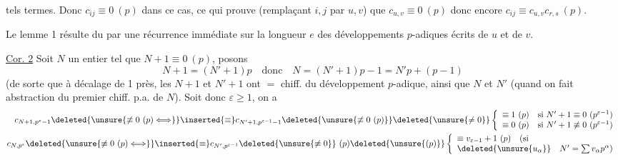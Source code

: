 
tels termes. Donc $c_{ij}\equiv0\ (p)$ dans ce cas, ce qui prouve (remplaçant $i,j$ par $u,v$) que $c_{u,v}\equiv0\ (p)$ donc encore $c_{ij}\equiv c_{u,v}c_{r,s}\ (p)$.

Le lemme 1 résulte du  par une récurrence immédiate sur la longueur $e$ des développements $p$-adiques écrits de $u$ et de $v$.

\uline{Cor. 2} Soit $N$ un entier  tel que $N+1\equiv0\ (p)$, posons
\[
N+1=(N'+1)p\quad\text{donc}\quad N=(N'+1)p-1=N'p+(p-1)
\]
(de sorte que à décalage de 1 près, les $N+1$ et $N'+1$ ont $=$ chiff. du développement $p$-adique, ainsi que $N$ et $N'$ (quand on fait abstraction du premier chiff. p.a. de $N$). Soit donc $\varepsilon\geq1$, on a
\[
\begin{aligned}
c_{N+1,p^\varepsilon-1}\deleted{\unsure{\not\equiv0\ (p)\Longleftrightarrow}}\inserted{\equiv}
c_{N'+1,p^{\varepsilon-1}-1}\deleted{\unsure{\not\equiv0\ (p)}}\deleted{\unsure{\ne0}}
\left\{\begin{array}{ll}
\equiv1\ (p)&\text{si }N'+1\equiv0\ (p^{\varepsilon-1})\\
\equiv0\ (p)&\text{si }N'+1\not\equiv0\ (p^{\varepsilon-1})
\end{array}\right.\\
c_{N,p^\varepsilon}\deleted{\unsure{\not\equiv0\ (p)\Longleftrightarrow}}\inserted{\equiv}
c_{N',p^{\varepsilon-1}}\deleted{\unsure{\not\equiv0}}\ (p)\deleted{\unsure{(p)}}
\left\{\begin{array}{l}\equiv v_{\varepsilon-1}+1\ (p)\quad(\text{si}\\
\deleted{\unsure{u_\alpha}}\quad N'=\sum v_\alpha p^\alpha)
\end{array}\right.
\end{aligned}
\]

